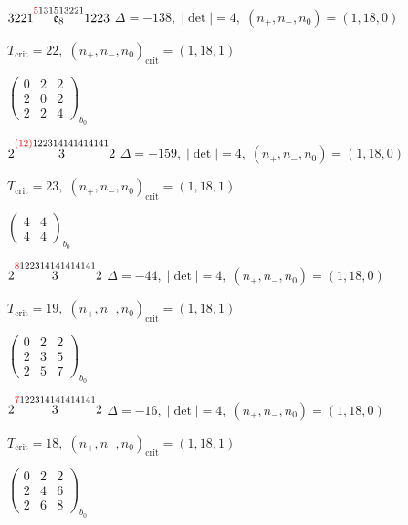 \documentclass[10pt]{article}
\begin{document}
$3221\overset{\textcolor{red}{5}131513221}{\mathfrak{e}_8}1223$ \quad $\Delta=-138,\; |\det|=4,\; (n_+,n_-,n_0)=(1,18,0)$

\hspace{1em}$T_{\text{crit}}=22,\; (n_+,n_-,n_0)_{\text{crit}}=(1,18,1)$

\hspace{2em}$\left(\begin{smallmatrix}0 & 2 & 2 \\ 2 & 0 & 2 \\ 2 & 2 & 4\end{smallmatrix}\right)_{\!b_0}$

\smallskip

$2\overset{\textcolor{red}{(12)}122314141414141}{3}2$ \quad $\Delta=-159,\; |\det|=4,\; (n_+,n_-,n_0)=(1,18,0)$

\hspace{1em}$T_{\text{crit}}=23,\; (n_+,n_-,n_0)_{\text{crit}}=(1,18,1)$

\hspace{2em}$\left(\begin{smallmatrix}4 & 4 \\ 4 & 4\end{smallmatrix}\right)_{\!b_0}$

$2\overset{\textcolor{red}{8}122314141414141}{3}2$ \quad $\Delta=-44,\; |\det|=4,\; (n_+,n_-,n_0)=(1,18,0)$

\hspace{1em}$T_{\text{crit}}=19,\; (n_+,n_-,n_0)_{\text{crit}}=(1,18,1)$

\hspace{2em}$\left(\begin{smallmatrix}0 & 2 & 2 \\ 2 & 3 & 5 \\ 2 & 5 & 7\end{smallmatrix}\right)_{\!b_0}$

$2\overset{\textcolor{red}{7}122314141414141}{3}2$ \quad $\Delta=-16,\; |\det|=4,\; (n_+,n_-,n_0)=(1,18,0)$

\hspace{1em}$T_{\text{crit}}=18,\; (n_+,n_-,n_0)_{\text{crit}}=(1,18,1)$

\hspace{2em}$\left(\begin{smallmatrix}0 & 2 & 2 \\ 2 & 4 & 6 \\ 2 & 6 & 8\end{smallmatrix}\right)_{\!b_0}$
\end{document}
